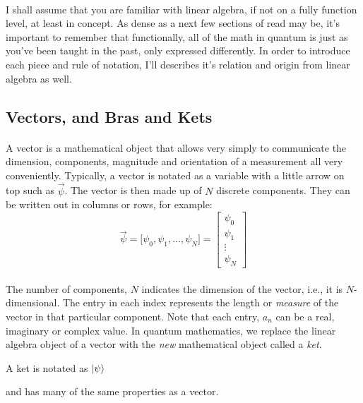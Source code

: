\documentclass[12pt,letterpaper]{book}
\begin{document}
\paragraph*{}I shall assume that you are familiar with linear algebra, if not on a fully function level, at least in concept. As dense as a next few sections of read may be, it's important to remember that functionally, all of the math in quantum is just as you've been taught in the past, only expressed differently. In order to introduce each piece and rule of notation, I'll describes it's relation and origin from linear algebra as well.


\subsection*{Vectors, and Bras and Kets}
\paragraph*{}A vector is a mathematical object that allows very simply to communicate the dimension, components, magnitude and orientation of a measurement all very conveniently. Typically, a vector is notated as a variable with a little arrow on top such as $\vec{\psi}$. The vector is then made up of $N$ discrete components. They can be written out in columns or rows, for example:
\begin{equation}
\label{vector}
\vec{\psi} = \big[ \psi_0 , \psi_1 , \hdots , \psi_N ] =
\begin{bmatrix}
\psi_0 \\ \psi_1  \\ \vdots \\ \psi_N
\end{bmatrix}
\end{equation}
\paragraph*{}The number of components, $N$ indicates the dimension of the vector, i.e., it is $N$-dimensional. The entry in each index represents the length or \textit{measure} of the vector in that particular component. Note that each entry, $a_n$ can be a real, imaginary or complex value. In quantum mathematics, we replace the linear algebra object of a vector with the \textit{new} mathematical object called a \textit{ket}.
\begin{center}
A ket is notated as $\ket{\psi}$ 
\end{center} 
and has many of the same properties as a vector.
\end{document}
